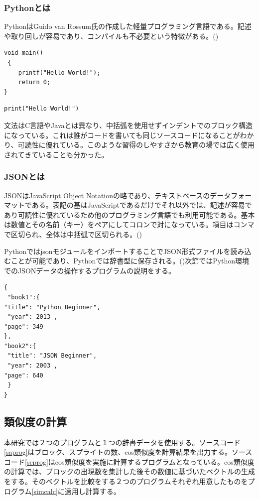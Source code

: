 \documentclass[a4paper,10pt,onecolumn,oneside,openany]{jsbook}
\begin{document}
\subsubsection{Pythonとは}
PythonはGuido van Rossum氏の作成した軽量プログラミング言語である。記述や取り回しが容易であり、コンパイルも不必要という特徴がある。(\cite{python})
 \begin{lstlisting}[caption=C言語,label=clan]
 void main()
 {
 	printf("Hello World!");
	return 0;
}
 \end{lstlisting}
 
 
 \begin{lstlisting}[caption=Python,label=python]
 print("Hello World!")
 \end{lstlisting}
 
文法はC言語やJavaとは異なり、中括弧を使用せずインデントでのブロック構造になっている。これは誰がコードを書いても同じソースコードになることがわかり、可読性に優れている。このような習得のしやすさから教育の場では広く使用されてきていることも分かった。
\subsubsection{JSONとは}
JSONはJavaScript Object Notationの略であり、テキストベースのデータフォーマットである。表記の基はJavaScriptであるだけでそれ以外では、記述が容易であり可読性に優れているため他のプログラミング言語でも利用可能である。基本は数値とその名前（キー）をペアにしてコロンで対になっている。項目はコンマで区切られ、全体は中括弧で区切られる。(\cite{json})

PythonではjsonモジュールをインポートすることでJSON形式ファイルを読み込むことが可能であり、Pythonでは辞書型に保存される。(\cite{json_py})次節ではPython環境でのJSONデータの操作するプログラムの説明をする。

 \begin{lstlisting}[caption=JSON,label=json]
 {
 "book1":{
"title": "Python Beginner",
 "year": 2013 ,
"page": 349
},
"book2":{
 "title": "JSON Beginner",
 "year": 2003 ,
"page": 640
 }
}
 \end{lstlisting}
 
\subsection{類似度の計算}
本研究では２つのプログラムと１つの辞書データを使用する。ソースコード\ref{saprog}はブロック、スプライトの数、cos類似度を計算結果を出力する。ソースコード\ref{scprog}はcos類似度を実施に計算するプログラムとなっている。cos類似度の計算では、ブロックの出現数を集計した後その数値に基づいたベクトルの生成をする。そのベクトルを比較をする２つのプログラムそれぞれ用意したものをプログラム\ref{simcalc}に適用し計算する。
\end{document}
